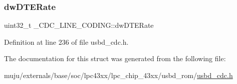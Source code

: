 \subsubsection{\texorpdfstring{dw\+D\+T\+E\+Rate}{dwDTERate}}
{\footnotesize\ttfamily uint32\+\_\+t \+\_\+\+C\+D\+C\+\_\+\+L\+I\+N\+E\+\_\+\+C\+O\+D\+I\+N\+G\+::dw\+D\+T\+E\+Rate}



Definition at line 236 of file usbd\+\_\+cdc.\+h.



The documentation for this struct was generated from the following file\+:\begin{DoxyCompactItemize}
\item 
muju/externals/base/soc/lpc43xx/lpc\+\_\+chip\+\_\+43xx/usbd\+\_\+rom/\hyperlink{usbd__cdc_8h}{usbd\+\_\+cdc.\+h}\end{DoxyCompactItemize}
